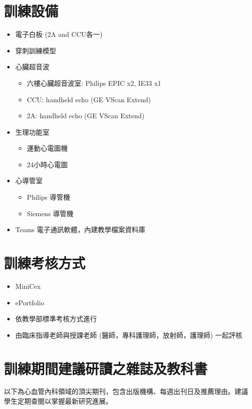 \documentclass[12pt,a4paper]{article}
\begin{document}
\section{訓練設備}
\begin{itemize}
    \item 電子白板 (2A and CCU各一)
    \item 穿刺訓練模型
    \item 心臟超音波
    \begin{itemize}
        \item 六樓心臟超音波室: Philips EPIC x2, IE33 x1
        \item CCU: handheld echo (GE VScan Extend)
        \item 2A: handheld echo (GE VScan Extend)
    \end{itemize}
    \item 生理功能室
    \begin{itemize}
        \item 運動心電圖機
        \item 24小時心電圖
    \end{itemize}
    \item 心導管室
    \begin{itemize}
        \item Philips 導管機
        \item Siemens 導管機
    \end{itemize}
    \item Teams 電子通訊軟體，內建教學檔案資料庫
\end{itemize}

\section{訓練考核方式}
\begin{itemize}
    \item MiniCex
    \item ePortfolio
    \item 依教學部標準考核方式進行
    \item 由臨床指導老師與授課老師 (醫師，專科護理師，放射師，護理師) 一起評核
\end{itemize}

\section{訓練期間建議研讀之雜誌及教科書}
以下為心血管內科領域的頂尖期刊，包含出版機構、每週出刊日及推薦理由。建議學生定期查閱以掌握最新研究進展。
\end{document}
